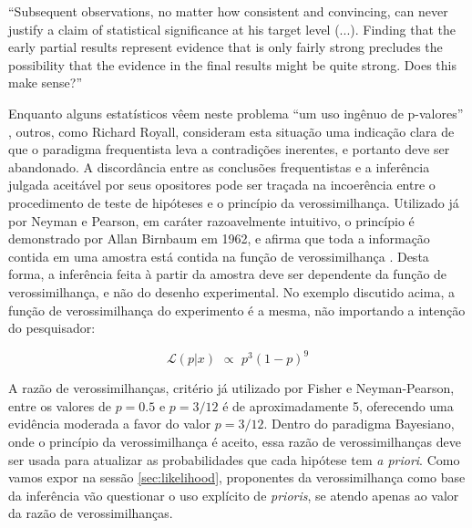 ``Subsequent observations, no matter how consistent and convincing, can never justify a claim of statistical significance
at his target level (...). Finding that the early partial results represent evidence that is only fairly strong precludes
the possibility that the evidence in the final results might be quite strong. Does this make sense?'' \citep{Royall97}

Enquanto alguns estatísticos vêem neste problema ``um uso ingênuo de p-valores'' \citep{Good92}, outros, como Richard Royall,
consideram esta situação uma indicação clara de que o paradigma frequentista leva a contradições inerentes, e portanto 
deve ser abandonado. A discordância entre as conclusões frequentistas e a inferência julgada aceitável por seus opositores 
pode ser traçada na incoerência entre
o procedimento de teste de hipóteses e o princípio da verossimilhança. Utilizado já por Neyman e Pearson\citep{Neyman1933},
em caráter razoavelmente intuitivo, o princípio é demonstrado por Allan Birnbaum em 1962, 
e afirma que toda a informação contida em uma amostra está	contida na função de verossimilhança \citep{Birnbaum62}. 
Desta forma, a inferência feita à partir da amostra deve ser dependente da função de verossimilhança, e não do desenho
experimental.
No exemplo discutido acima, a função de verossimilhança do experimento é a mesma, não importando a intenção do pesquisador:

\begin{equation}
	\mathcal{L}(p|x) \,\, \propto \,\, p^3(1-p)^9
\end{equation}

A razão de verossimilhanças, critério já utilizado por Fisher e Neyman-Pearson, entre os valores de $p=0.5$ e $p=3/12$ é de 
aproximadamente 5, oferecendo uma evidência moderada a favor do valor $p=3/12$. Dentro do paradigma Bayesiano, onde o princípio
da verossimilhança é aceito, essa razão de verossimilhanças deve ser usada para atualizar as probabilidades que cada hipótese
tem {\em a priori}. Como vamos expor na sessão \ref{sec:likelihood}, proponentes da verossimilhança como base da inferência
vão questionar o uso explícito de {\em prioris}, se atendo apenas ao valor da razão de verossimilhanças.

